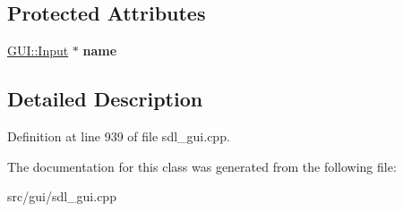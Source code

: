\subsection*{Protected Attributes}
\begin{DoxyCompactItemize}
\item 
\hypertarget{classSaveDialog_a112cebb10bd8304b2eaf491beded0abb}{\hyperlink{classGUI_1_1Input}{G\-U\-I\-::\-Input} $\ast$ {\bfseries name}}\label{classSaveDialog_a112cebb10bd8304b2eaf491beded0abb}

\end{DoxyCompactItemize}


\subsection{Detailed Description}


Definition at line 939 of file sdl\-\_\-gui.\-cpp.



The documentation for this class was generated from the following file\-:\begin{DoxyCompactItemize}
\item 
src/gui/sdl\-\_\-gui.\-cpp\end{DoxyCompactItemize}
